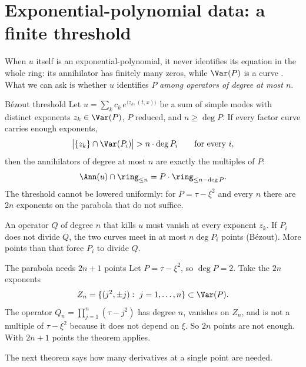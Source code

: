 \section{Exponential-polynomial data: a finite threshold}

When $u$ itself is an exponential-polynomial, it never identifies its equation in the whole ring: its annihilator has finitely many zeros, while $\Var(P)$ is a curve . What we can ask is whether $u$ identifies $P$ \emph{among operators of degree at most $n$}.

\begin{theorem}{B\'ezout threshold  \proved}\label{thm:bezout}
Let $u=\sum_kc_k\,e^{\langle z_k,(t,x)\rangle}$ be a sum of simple modes with distinct exponents $z_k\in\Var(P)$, $P$ reduced, and $n\ge\deg P$. If every factor curve carries enough exponents,
\[
\big|\{z_k\}\cap\Var(P_i)\big|>n\cdot\deg P_i\qquad\text{for every }i,
\]
then the annihilators of degree at most $n$ are exactly the multiples of $P$:
\[
\Ann(u)\cap\ring_{\le n}=P\cdot\ring_{\le n-\deg P}.
\]
The threshold cannot be lowered uniformly: for $P=\tau-\xi^2$ and every $n$ there are $2n$ exponents on the parabola that do not suffice.

\end{theorem}

\begin{intuition}
An operator $Q$ of degree $n$ that kills $u$ must vanish at every exponent $z_k$. If $P_i$ does not divide $Q$, the two curves meet in at most $n\deg P_i$ points (B\'ezout). More points than that force $P_i$ to divide $Q$.
\end{intuition}

\begin{example}{The parabola needs $2n+1$ points}
Let $P=\tau-\xi^2$, so $\deg P=2$. Take the $2n$ exponents
\[
Z_n=\{(j^2,\pm j):\ j=1,\dots,n\}\subset\Var(P).
\]
The operator $Q_n=\prod_{j=1}^n(\tau-j^2)$ has degree $n$, vanishes on $Z_n$, and is not a multiple of $\tau-\xi^2$ because it does not depend on $\xi$. So $2n$ points are not enough. With $2n+1$ points the theorem applies.
\end{example}

The next theorem says how many derivatives at a single point are needed.

